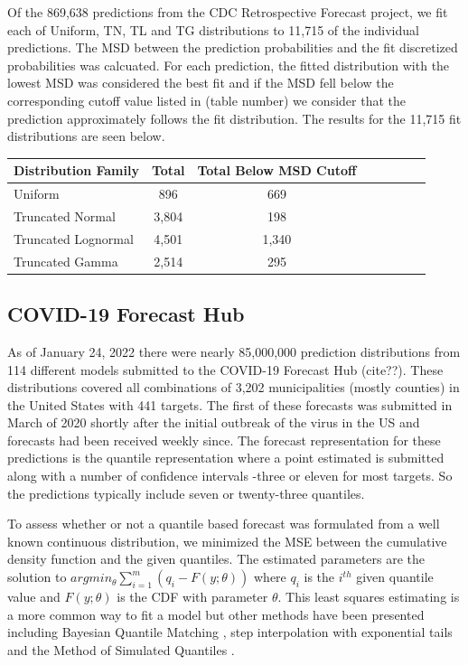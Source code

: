 \documentclass{article}\usepackage[]{graphicx}\usepackage[]{color}
\begin{document}
Of the 869,638 predictions from the CDC Retrospective Forecast project, we fit
each of Uniform, TN, TL and TG distributions to 11,715 of the individual 
predictions. The MSD between the prediction probabilities and the fit
discretized probabilities was calcuated. For each prediction, the fitted 
distribution with the lowest MSD was considered the best fit and if the MSD fell
below the corresponding cutoff value listed in (table number) we consider that 
the prediction approximately follows the fit distribution. The results for the
11,715 fit distributions are seen below.

\begin{table}[h!]
  \centering
  \begin{tabular}{l*{6}{c}r}
  Distribution Family   & Total    & Total Below MSD Cutoff \\
  \hline
  Uniform               & 896      & 669    \\
  Truncated Normal      & 3,804    & 198    \\
  Truncated Lognormal   & 4,501    & 1,340  \\
  Truncated Gamma       & 2,514    & 295    \\
  \end{tabular}
\end{table}

\subsection{COVID-19 Forecast Hub}

As of January 24, 2022 there were nearly 85,000,000 prediction distributions 
from 114 different models submitted to the COVID-19 Forecast Hub (cite??). These 
distributions covered all combinations of 3,202 municipalities (mostly counties) 
in the United States with 441 targets. The first of these forecasts was 
submitted in March of 2020 shortly after the initial outbreak of the virus in 
the US and forecasts had been received weekly since. The forecast representation
for these predictions is the quantile representation where a point estimated is
submitted along with a number of confidence intervals -three or eleven for most
targets. So the predictions typically include seven or twenty-three quantiles.

To assess whether or not a quantile based forecast was formulated from a well
known continuous distribution, we minimized the MSE between the cumulative
density function and the given quantiles. The estimated parameters are the 
solution to $argmin_{\theta} \sum_{i=1}^m (q_i - F(y; \theta))$ where $q_i$ is
the $i^{th}$ given quantile value and $F(y; \theta)$ is the CDF with parameter
$\theta$. This least squares estimating is a more common way to fit a model but
other methods have been presented including Bayesian Quantile Matching
\cite{nirwan2020bayesian}, step interpolation with exponential tails 
\cite{quinonero2005evaluating}
and the Method of Simulated Quantiles 
\cite{dominicy2013method}.
\end{document}
